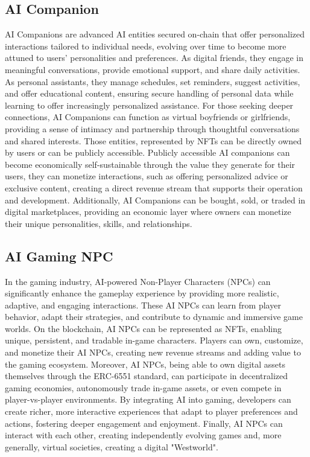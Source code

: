 \documentclass{article}
\begin{document}
\subsection{AI Companion}

AI Companions are advanced AI entities secured on-chain that offer personalized interactions tailored to individual needs, evolving over time to become more attuned to users’ personalities and preferences. As digital friends, they engage in meaningful conversations, provide emotional support, and share daily activities. As personal assistants, they manage schedules, set reminders, suggest activities, and offer educational content, ensuring secure handling of personal data while learning to offer increasingly personalized assistance. For those seeking deeper connections, AI Companions can function as virtual boyfriends or girlfriends, providing a sense of intimacy and partnership through thoughtful conversations and shared interests. Those entities, represented by NFTs can be directly owned by users or can be publicly accessible. Publicly accessible AI companions can become economically self-sustainable through the value they generate for their users,  they can monetize interactions, such as offering personalized advice or exclusive content, creating a direct revenue stream that supports their operation and development. Additionally, AI Companions can be bought, sold, or traded in digital marketplaces, providing an economic layer where owners can monetize their unique personalities, skills, and relationships.

\subsection{AI Gaming NPC}


In the gaming industry, AI-powered Non-Player Characters (NPCs) can significantly enhance the gameplay experience by providing more realistic, adaptive, and engaging interactions. These AI NPCs can learn from player behavior, adapt their strategies, and contribute to dynamic and immersive game worlds. On the blockchain, AI NPCs can be represented as NFTs, enabling unique, persistent, and tradable in-game characters. Players can own, customize, and monetize their AI NPCs, creating new revenue streams and adding value to the gaming ecosystem. Moreover, AI NPCs, being able to own digital assets themselves through the ERC-6551 standard, can participate in decentralized gaming economies, autonomously trade in-game assets, or even compete in player-vs-player environments. By integrating AI into gaming, developers can create richer, more interactive experiences that adapt to player preferences and actions, fostering deeper engagement and enjoyment. Finally, AI NPCs can interact with each other, creating independently evolving games and, more generally, virtual societies, creating a digital "Westworld".
\end{document}
